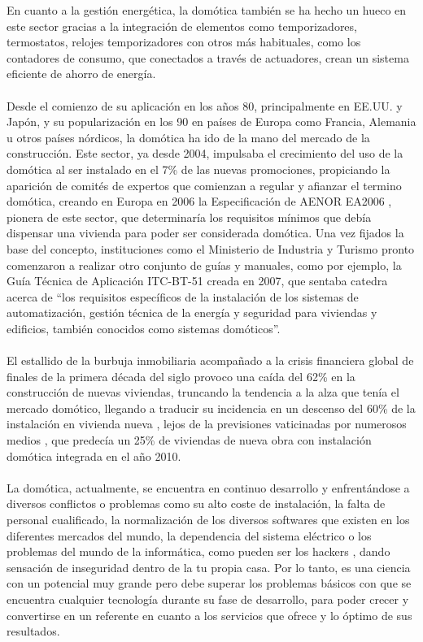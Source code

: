 En cuanto a la gestión energética, la domótica también se ha hecho un hueco en este sector gracias a la integración de elementos como temporizadores, termostatos, relojes temporizadores con otros más habituales, como los contadores de consumo, que conectados a través de actuadores, crean un sistema eficiente de ahorro de energía.\\\\
Desde el comienzo de su aplicación en los años 80, principalmente en EE.UU. y Japón, y su popularización en los 90 en países de Europa como Francia, Alemania u otros países nórdicos, la domótica ha ido de la mano del mercado de la construcción. Este sector, ya desde 2004, impulsaba el crecimiento del uso de la domótica al ser instalado en el 7\% \cite{Ikei:2004} de las nuevas promociones, propiciando la aparición de comités de expertos que comienzan a regular y afianzar el termino domótica, creando en Europa en 2006 la Especificación de AENOR EA2006 \cite{direct:2004}, pionera de este sector, que determinaría los requisitos mínimos que debía dispensar una vivienda para poder ser considerada domótica. Una vez fijados la base del concepto, instituciones  como el Ministerio de Industria y Turismo pronto comenzaron a realizar otro conjunto de guías y manuales, como por ejemplo, la Guía Técnica de Aplicación ITC-BT-51 \cite{BOE:2002} creada en 2007, que sentaba catedra acerca de “los requisitos específicos de la instalación de los sistemas de automatización, gestión técnica de la energía y seguridad para viviendas y edificios, también conocidos como sistemas domóticos”.\\\\ 
El estallido de la burbuja inmobiliaria acompañado a la crisis financiera global de finales de la primera década del siglo provoco una caída del 62\% en la construcción de nuevas viviendas, truncando la tendencia a la alza que tenía el mercado domótico, llegando a traducir su incidencia en un descenso del 60\% de la instalación en vivienda nueva \cite{AED:2011}, lejos de la previsiones vaticinadas por numerosos medios \cite{mundo:2010} \cite{Info:2008}, que predecía un 25\% de viviendas de nueva obra con instalación domótica integrada en el año 2010.\\\\
 La domótica, actualmente, se encuentra en continuo desarrollo y enfrentándose a diversos conflictos o problemas como su alto coste de instalación, la falta de personal cualificado, la normalización de los diversos softwares que existen en los diferentes mercados del mundo, la dependencia del sistema eléctrico o los problemas del mundo de la informática, como pueden ser los hackers \cite{cerda:2018}, dando sensación de inseguridad dentro de la tu propia casa. Por lo tanto, es una ciencia con un potencial muy grande pero debe superar los problemas básicos con que se encuentra cualquier tecnología durante su fase de desarrollo, para poder crecer y convertirse en un referente en cuanto a los servicios que ofrece y lo óptimo de sus resultados.\\\\
